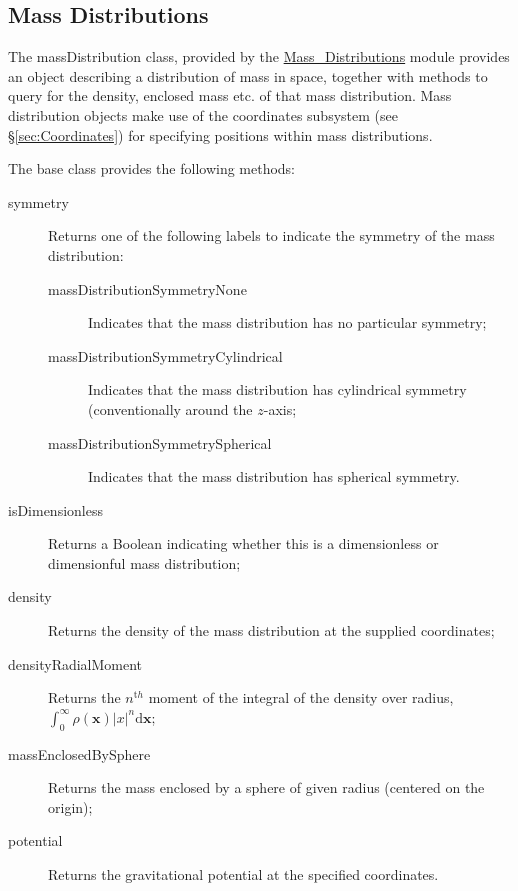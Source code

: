 \subsection{Mass Distributions}\label{sec:MassDistributions}

The {\normalfont \ttfamily massDistribution} class, provided by the \hyperlink{objects.mass_distributions.F90:mass_distributions}{\normalfont \ttfamily Mass\_Distributions} module provides an object describing a distribution of mass in space, together with methods to query for the density, enclosed mass etc. of that mass distribution. Mass distribution objects make use of the {\normalfont \ttfamily coordinates} subsystem (see \S\ref{sec:Coordinates}) for specifying positions within mass distributions.

The base class provides the following methods:
\begin{description}
\item [{\normalfont \ttfamily symmetry}] Returns one of the following labels to indicate the symmetry of the mass distribution:
 \begin{description}
  \item [{\normalfont \ttfamily massDistributionSymmetryNone}] Indicates that the mass distribution has no particular symmetry;
  \item [{\normalfont \ttfamily massDistributionSymmetryCylindrical}] Indicates that the mass distribution has cylindrical symmetry (conventionally around the $z$-axis;
  \item [{\normalfont \ttfamily massDistributionSymmetrySpherical}] Indicates that the mass distribution has spherical symmetry.
 \end{description}
\item [{\normalfont \ttfamily isDimensionless}] Returns a Boolean indicating whether this is a dimensionless or dimensionful mass distribution;
\item [{\normalfont \ttfamily density}] Returns the density of the mass distribution at the supplied {\normalfont \ttfamily coordinates};
\item [{\normalfont \ttfamily densityRadialMoment}] Returns the $n^{\mathrm th}$ moment of the integral of the density over radius, $\int_0^\infty \rho({\mathbf x}) |x|^n {\mathrm d} {\mathbf x}$; 
\item [{\normalfont \ttfamily massEnclosedBySphere}] Returns the mass enclosed by a sphere of given {\normalfont \ttfamily radius} (centered on the origin);
\item [{\normalfont \ttfamily potential}] Returns the gravitational potential at the specified {\normalfont \ttfamily coordinates}.
\end{description}

